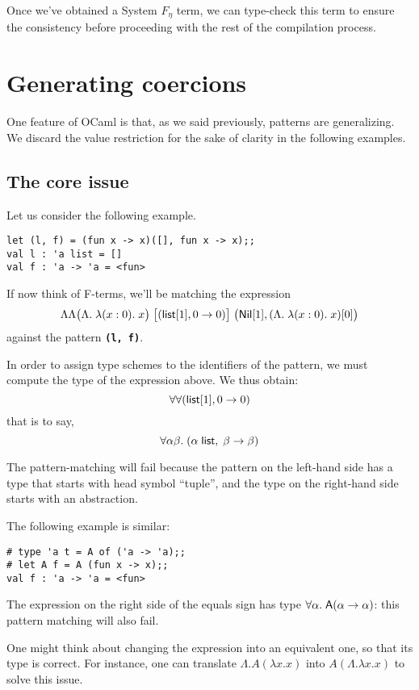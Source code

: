 \documentclass[10pt,a4paper,twoside,titlepage,twocolumn]{article}
\newcommand{\code}[1]{\textbf{\texttt{#1}}}
\begin{document}
Once we've obtained a System $F_\eta$ term, we can type-check this term to
ensure the consistency before proceeding with the rest of the compilation
process.

\section{Generating coercions}

One feature of OCaml is that, as we said previously, patterns are generalizing.
We discard the value restriction for the sake of clarity in the following
examples.

\subsection{The core issue}

Let us consider the following example.

\begin{verbatim}
let (l, f) = (fun x -> x)([], fun x -> x);;
val l : 'a list = []
val f : 'a -> 'a = <fun>
\end{verbatim}

If now think of F-terms, we'll be matching the expression
$$\Lambda\Lambda \big(\Lambda.\;\lambda (x: 0).\; x\big)
\;\big[(\text{\textsf{list}}[1], 0\to0)\big]
\;\big(\text{\textsf{Nil}}[1], (\Lambda.\;\lambda (x: 0).\; x) [0]\big)
$$
against the pattern \code{(l, f)}.

In order to assign type schemes to the identifiers of the pattern, we must
compute the type of the expression above. We thus obtain:
$$\forall\forall(\text{\textsf{list}}[1],0\to0)$$
that is to say,
$$\forall\alpha\beta.\; (\alpha\;\text{\textsf{list}},\;\beta\to\beta)$$

The pattern-matching will fail because the pattern on the left-hand
side has a type that starts with head symbol ``tuple'', and the type on
the right-hand side starts with an abstraction.

The following example is similar:

\begin{verbatim}
# type 'a t = A of ('a -> 'a);;
# let A f = A (fun x -> x);;
val f : 'a -> 'a = <fun>
\end{verbatim}

The expression on the right side of the
equals sign has type $\forall\alpha.\; \text{\textsf{A}} (\alpha\to\alpha)$: this pattern matching will also fail.

One might think about changing the expression into an equivalent one, so that
its type is correct. For instance, one can translate
$\Lambda.  A(\lambda x. x)$ into $A (\Lambda.\lambda x. x)$ to solve this issue.
\end{document}
